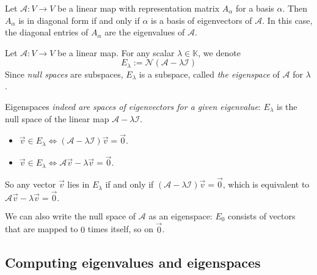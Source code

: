 \begin{theorem}
    Let $\mathcal{A}: V \to V$ be a linear map with representation matrix $A_\alpha$ for a basis $\alpha$. Then $A_\alpha$
    is in diagonal form if and only if $\alpha$ is a basis of eigenvectors of $\mathcal{A}$. In this case, the diagonal
    entries of $A_\alpha$ are the eigenvalues of $\mathcal{A}$.
\end{theorem}

\begin{definition}[Eigenspace]
    Let $\mathcal{A}: V \to V$ be a linear map. For any scalar $\lambda \in \mathbb{K}$, we denote
    $$E_\lambda := \mathcal{N}(\mathcal{A} - \lambda\mathcal{I})$$
    Since \emph{null spaces} are subspaces, $E_\lambda$ is a subspace, called \emph{the eigenspace} of $\mathcal{A}$ for $\lambda$.
\end{definition}

\begin{remark}
Eigenspaces \emph{indeed are spaces of eigenvectors for a given eigenvalue}: $E_\lambda$ is the null space of the linear map $\mathcal{A} - \lambda \mathcal{I}$.
\begin{itemize}
    \item $\vec{v} \in E_\lambda \iff (\mathcal{A}-\lambda\mathcal{I})\vec{v} = \vec{0}$.
    \item $\vec{v} \in E_\lambda \iff \mathcal{A}\vec{v} - \lambda\vec{v} = \vec{0}$.
\end{itemize}
So any vector $\vec{v}$ lies in $E_\lambda$ if and only if $(\mathcal{A}-\lambda\mathcal{I})\vec{v} = \vec{0}$, which is equivalent to $\mathcal{A}\vec{v} - \lambda\vec{v} = \vec{0}.$
\end{remark}

\begin{remark}
    We can also write the null space of $\mathcal{A}$ as an eigenspace: $E_0$ consists of vectors that are mapped to $0$ times itself, so on $\vec{0}$.
\end{remark}

\subsection{Computing eigenvalues and eigenspaces}

